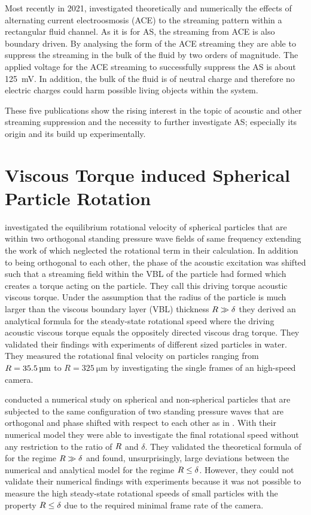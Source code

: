 Most recently in 2021,  investigated theoretically and 
numerically the effects of alternating current electroosmosis (ACE) to the 
streaming pattern within a rectangular fluid channel. As it is for AS, the 
streaming from ACE is also boundary driven. By analysing the form of the ACE 
streaming they are able to suppress the streaming in the bulk of the fluid by 
two orders of magnitude. The applied voltage for the ACE streaming to 
successfully suppress the AS is about \SI{125}{\milli\volt}. In addition, the 
bulk of the fluid is of neutral charge and therefore no electric charges could 
harm possible living objects within the system.

These five publications show the rising interest in the topic of acoustic and 
other streaming suppression and the necessity to further investigate AS; 
especially its origin and its build up experimentally.

\section{Viscous Torque induced Spherical Particle Rotation}

 investigated the equilibrium rotational velocity of 
spherical particles that are within two orthogonal standing pressure wave 
fields of same frequency extending the work of  which neglected 
the rotational term in their calculation. In addition to being orthogonal to 
each other, the phase of the acoustic excitation was shifted such that a 
streaming field within the VBL of the particle had formed which creates a 
torque acting on the particle. They call this driving torque acoustic viscous 
torque. Under the assumption that the radius of the particle is much larger 
than the viscous boundary layer (VBL) thickness $R\gg\delta$ they derived an 
analytical formula for the steady-state rotational speed where the driving 
acoustic viscous torque equals the oppositely directed viscous drag torque.  
They validated their findings with experiments of different sized particles in 
water. They measured the rotational final velocity on particles ranging from 
$R=\SI{35.5}{\si{\micro\meter}}$ to $R=\SI{325}{\um}$ by investigating the single frames of 
an high-speed camera.

 conducted a numerical study on spherical and non-spherical 
particles that are subjected to the same configuration of two standing pressure 
waves that are orthogonal and phase shifted with respect to each other as in 
. With their numerical model they were able to investigate 
the final rotational speed without any restriction to the ratio of $R$ and 
$\delta$. They validated the theoretical formula of~\cite{Lamprecht2015} for 
the regime $R\gg\delta$ and found, unsurprisingly, large deviations between 
the numerical and analytical model for the regime $R\leq\delta$. However, they 
could not validate their numerical findings with experiments because it was not 
possible to measure the high steady-state rotational speeds of small particles 
with the property $R\leq\delta$ due to the required minimal frame rate of the 
camera.

